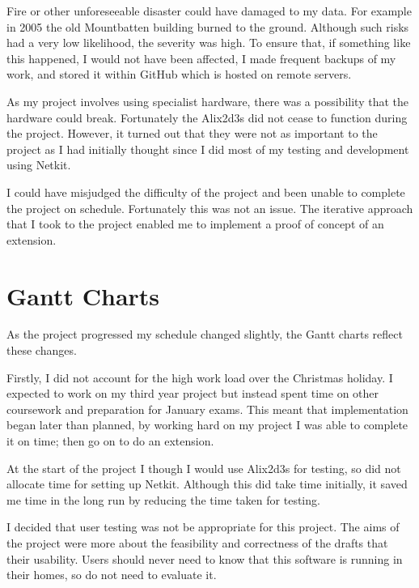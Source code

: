 \documentclass[12pt,a4paper,twoside]{report}
\begin{document}
Fire or other unforeseeable disaster could have damaged to my data. For example
in 2005 the old Mountbatten building burned to the ground. Although such risks
had a very low likelihood, the severity was high.  To ensure that, if something
like this happened, I would not have been affected, I made frequent backups of
my work, and stored it within GitHub which is hosted on remote servers.

As my project involves using specialist hardware, there was a possibility that
the hardware could break. Fortunately the Alix2d3s did not cease to function
during the project. However, it turned out that they were not as important to
the project as I had initially thought since I did most of my testing and
development using Netkit.

I could have misjudged the difficulty of the project and been unable to complete
the project on schedule. Fortunately this was not an issue. The iterative
approach that I took to the project enabled me to implement a proof of
concept of an extension.  

\section{Gantt Charts}
As the project progressed my schedule changed slightly, the Gantt charts
reflect these changes.

Firstly, I did not account for the high work load over the Christmas holiday. I
expected to work on my third year project but instead spent time on other
coursework and preparation for January exams. This meant that implementation
began later than planned, by working hard on my project I was able to complete
it on time; then go on to do an extension. 

At the start of the project I though I would use Alix2d3s for testing, so
did not allocate time for setting up Netkit. Although this did take time
initially, it saved me time in the long run by reducing the time taken for
testing. 

I decided that user testing was not be appropriate for this project. The aims
of the project were more about the feasibility and correctness of the drafts
that their usability. Users should never need to know that this software is
running in their homes, so do not need to evaluate it. 
\end{document}
